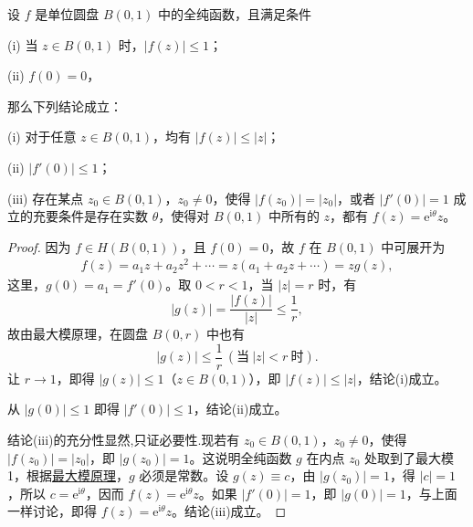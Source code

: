\documentclass[../../main.tex]{subfiles}%
\begin{document}
\begin{theorem}[Schwarz引理]\label{theorem:Schwarz引理-定理4.5.3}
设 \( f \) 是单位圆盘 \( B(0,1) \) 中的全纯函数，且满足条件

(i) 当 \( z \in B(0,1) \) 时，\( |f(z)| \leqslant  1 \)；

(ii) \( f(0) = 0 \)，

那么下列结论成立：

(i) 对于任意 \( z \in B(0,1) \)，均有 \( |f(z)| \leqslant  |z| \)；

(ii) \( |f'(0)| \leqslant  1 \)；

(iii) 存在某点 \( z_0 \in B(0,1) \)，\( z_0 \neq 0 \)，使得 \( |f(z_0)| = |z_0| \)，或者 \( |f'(0)| = 1 \) 成立的充要条件是存在实数 \( \theta \)，使得对 \( B(0,1) \) 中所有的 \( z \)，都有 \( f(z) = \mathrm{e}^{\mathrm{i}\theta} z \)。
\end{theorem}
\begin{proof}

因为 \( f \in H(B(0,1)) \)，且 \( f(0) = 0 \)，故 \( f \) 在 \( B(0,1) \) 中可展开为
\begin{align*}
f(z) = a_1 z + a_2 z^2 + \cdots = z(a_1 + a_2 z + \cdots) = z g(z),
\end{align*}
这里，\( g(0) = a_1 = f'(0) \)。取 \( 0 < r < 1 \)，当 \( |z| = r \) 时，有
\[
|g(z)| = \frac{|f(z)|}{|z|} \leqslant  \frac{1}{r},
\]
故由最大模原理，在圆盘 \( B(0,r) \) 中也有
\[
|g(z)| \leqslant  \frac{1}{r} \, (\text{当} \ |z| < r \ \text{时}).
\]
让 \( r \to 1 \)，即得 \( |g(z)| \leqslant  1 \)（\( z \in B(0,1) \)），即 \( |f(z)| \leqslant  |z| \)，结论(i)成立。

从 \( |g(0)| \leqslant  1 \) 即得 \( |f'(0)| \leqslant  1 \)，结论(ii)成立。

结论(iii)的充分性显然,只证必要性.现若有 \( z_0 \in B(0,1) \)，\( z_0 \neq 0 \)，使得 \( |f(z_0)| = |z_0| \)，即 \( |g(z_0)| = 1 \)。这说明全纯函数 \( g \) 在内点 \( z_0 \) 处取到了最大模 1，根据\hyperref[theorem:最大模原理-定理4.5.1]{最大模原理}，\( g \) 必须是常数。设 \( g(z) \equiv c \)，由 \( |g(z_0)| = 1 \)，得 \( |c| = 1 \)，所以 \( c = \mathrm{e}^{\mathrm{i}\theta} \)，因而 \( f(z) = \mathrm{e}^{\mathrm{i}\theta} z \)。如果 \( |f'(0)| = 1 \)，即 \( |g(0)| = 1 \)，与上面一样讨论，即得 \( f(z) = \mathrm{e}^{\mathrm{i}\theta} z \)。结论(iii)成立。

\end{proof}
\end{document}
